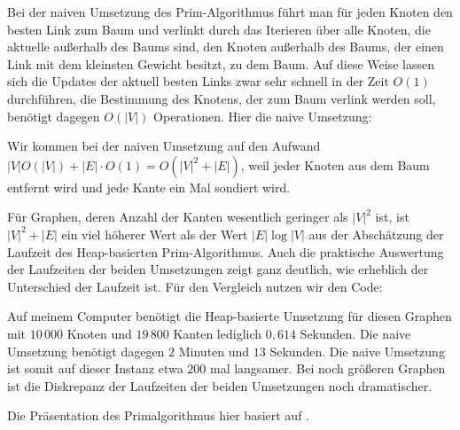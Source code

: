 \begin{bem}
	Bei der naiven Umsetzung des Prim-Algorithmus führt man für jeden Knoten den besten Link zum Baum und verlinkt durch das Iterieren über alle Knoten, die aktuelle außerhalb des Baums sind, den Knoten außerhalb des Baums, der einen Link mit dem kleinsten Gewicht besitzt, zu dem Baum. Auf diese Weise lassen sich die Updates der aktuell besten Links zwar sehr schnell in der Zeit $O(1)$ durchführen, die Bestimmung des Knotens, der zum Baum verlink werden soll, benötigt dagegen $O(|V|)$ Operationen. Hier die naive Umsetzung: 
	 
	
	
	Wir kommen bei der naiven Umsetzung auf den Aufwand $|V| O(|V|) + |E| \cdot O(1) = O(|V|^2 + |E|)$, weil jeder Knoten aus dem Baum entfernt wird und jede Kante ein Mal sondiert wird. 
	
	 Für Graphen, deren Anzahl der Kanten wesentlich geringer als $|V|^2$ ist, ist $|V|^2 + |E|$ ein viel höherer Wert als der Wert $|E| \log |V|$ aus der Abschätzung der Laufzeit des Heap-basierten Prim-Algorithmus. Auch die praktische Auswertung der Laufzeiten der beiden Umsetzungen zeigt ganz deutlich, wie erheblich der Unterschied der Laufzeit ist. Für den Vergleich nutzen wir den Code: 

	 	 
	 
	 Auf meinem Computer benötigt die Heap-basierte Umsetzung für diesen Graphen mit $10 \, 000$ Knoten und $19\, 800$ Kanten lediglich $0{,}614$ Sekunden. Die naive Umsetzung benötigt dagegen $2$ Minuten und $13$ Sekunden. Die naive Umsetzung ist somit auf dieser Instanz etwa $200$ mal langsamer. Bei noch größeren Graphen ist die Diskrepanz der Laufzeiten der beiden Umsetzungen noch dramatischer. 
\end{bem} 

\begin{bem}
	Die Präsentation des  Primalgorithmus hier basiert auf  \cite{CLRS17}. 
\end{bem} 





